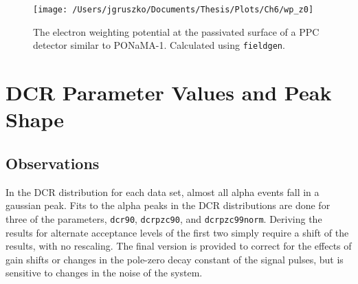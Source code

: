 \begin{figure}[]
 \centering
 \texttt{[image: /Users/jgruszko/Documents/Thesis/Plots/Ch6/wp\_z0]}
 \caption{The electron weighting potential at the passivated surface of a PPC detector similar to PONaMA-1. Calculated using {\tt fieldgen}.} 
 \label{fig:wp_z0}
\end{figure}

\section{DCR Parameter Values and Peak Shape}
\subsection{Observations}
In the DCR distribution for each data set, almost all alpha events fall in a gaussian peak. Fits to the alpha peaks in the DCR distributions are done for three of the parameters, {\tt dcr90}, {\tt dcrpzc90}, and {\tt dcrpzc99norm}. Deriving the results for alternate acceptance levels of the first two simply require a shift of the results, with no rescaling. The final version is provided to correct for the effects of gain shifts or changes in the pole-zero decay constant of the signal pulses, but is sensitive to changes in the noise of the system. 

